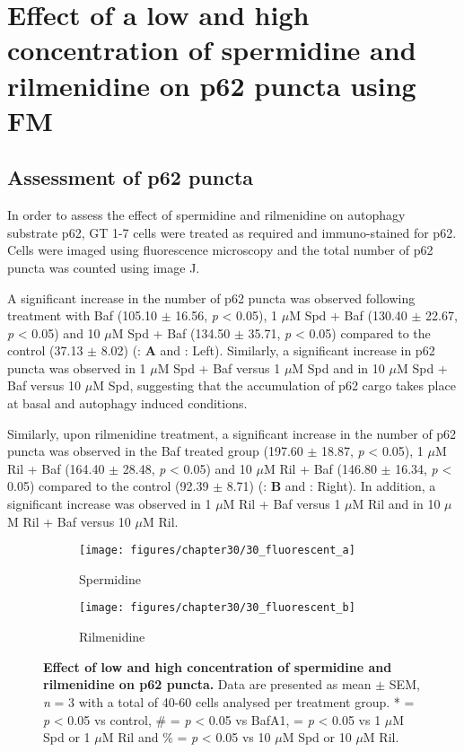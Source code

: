 {\section{Effect of a low and high concentration of spermidine and rilmenidine on p62 puncta using FM}
\subsection{Assessment of p62 puncta}

In order to assess the effect of spermidine and rilmenidine on autophagy substrate p62, GT 1-7 cells were treated as required and immuno-stained for p62. Cells were imaged using fluorescence microscopy and the total number of p62 puncta was counted using image J. 

A significant increase in the number of p62 puncta was observed following treatment with Baf (105.10 $\pm$ 16.56, \textit{p} < 0.05), 1 $\mu$M Spd + Baf (130.40 $\pm$ 22.67, \textit{p} < 0.05) and 10 $\mu$M Spd + Baf (134.50 $\pm$ 35.71, \textit{p} < 0.05) compared to the control (37.13 $\pm$ 8.02) (: \textbf{A} and : Left). Similarly, a significant increase in p62 puncta was observed in 1 $\mu$M Spd + Baf versus 1 $\mu$M Spd and in 10 $\mu$M Spd + Baf versus 10 $\mu$M Spd, suggesting that the accumulation of p62 cargo takes place at basal and autophagy induced conditions. 

Similarly, upon rilmenidine treatment, a significant increase in the number of p62 puncta was observed in the Baf treated group (197.60 $\pm$ 18.87, \textit{p} < 0.05), 1 $\mu$M Ril + Baf (164.40 $\pm$ 28.48, \textit{p} < 0.05) and 10 $\mu$M Ril + Baf (146.80 $\pm$ 16.34, \textit{p} < 0.05) compared to the control (92.39 $\pm$ 8.71) (: \textbf{B} and : Right). In addition, a significant increase was observed in 1 $\mu$M Ril + Baf versus 1 $\mu$M Ril and in 10 $\mu$M Ril + Baf versus 10 $\mu$M Ril.

\begin{figure}[!htbp]
  \begin{subfigure}[b]{0.495\linewidth}
    \texttt{[image: figures/chapter30/30\_fluorescent\_a]}
    \caption{Spermidine}
  \end{subfigure}
  \begin{subfigure}[b]{0.495\linewidth}
    \texttt{[image: figures/chapter30/30\_fluorescent\_b]}
    \caption{Rilmenidine}
  \end{subfigure}
    \caption[Effect of a low and high concentration of spermidine and rilmenidine on p62 puncta]{\textbf{Effect of low and high concentration of spermidine and rilmenidine on p62 puncta.} Data are presented as mean $\pm$ SEM, \textit{n} = 3 with a total of 40-60 cells analysed per treatment group. * = \textit{p} < 0.05 vs control, \# = \textit{p} < 0.05 vs BafA1, \@ = \textit{p} < 0.05 vs 1 $\mu$M Spd or 1 $\mu$M Ril and \% = \textit{p} < 0.05 vs 10 $\mu$M Spd or 10 $\mu$M Ril.}
  \label{fig:30_fluorescent_graph}
\end{figure}

}
